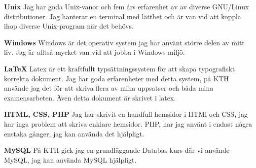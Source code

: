 \documentclass[margin,line]{resume}%
\begin{document}
\begin{resume}
		\textbf{Unix}\hspace{0.5cm}
		Jag har goda Unix-vanor och fem års erfarenhet av av diverse GNU/Linux
		distributioner. Jag hanterar en terminal med lätthet och är van
		vid att koppla ihop diverse Unix-program när det behövs.

		\textbf{Windows}\hspace{0.5cm}
		Windows är det operativ system jag har använt större delen av mitt liv.
		Jag är alltså mycket van vid att jobba i Windows miljö.

		\textbf{\LaTeX}\hspace{0.5cm}
		Latex är ett kraftfullt typsättningssystem för att skapa typografiskt
		korrekta dokument. Jag har goda erfarenheter med detta system, på KTH
		använde jag det för att skriva flera av mina uppsatser och båda mina
		examensarbeten. Även detta dokument är skrivet i latex.

		\textbf{HTML, CSS, PHP}\hspace{0.5cm}
		Jag har skrivit en handfull hemsidor i HTMl och CSS, jag har inga
		problem att skriva enklare hemsidor. PHP, har jag använt i endast
		några enstaka gånger, jag kan använda det hjälpligt.

		\textbf{MySQL}\hspace{0.5cm}
		På KTH gick jag en grundläggande Databas-kurs där vi använde MySQL,
		jag kan använda MySQL hjälpligt.


\end{resume}
\end{document}
